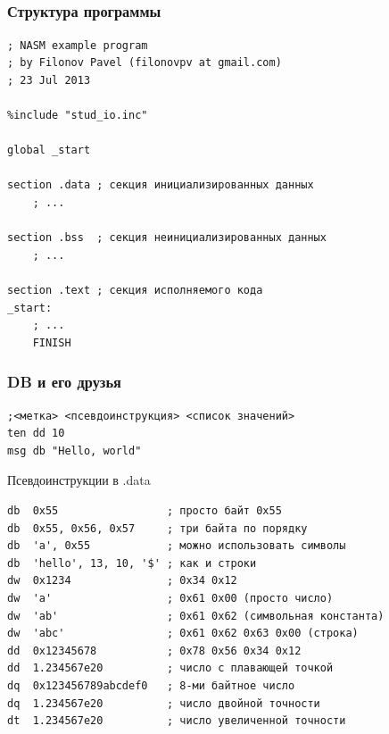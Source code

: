 \documentclass[utf8, russian]{beamer}
\begin{document}
    \subsection{}
    \begin{frame}[fragile]
        \frametitle{Структура программы}\small
        \begin{verbatim}
; NASM example program
; by Filonov Pavel (filonovpv at gmail.com)
; 23 Jul 2013

%include "stud_io.inc"

global _start

section .data ; секция инициализированных данных
    ; ...

section .bss  ; секция неинициализированных данных 
    ; ...

section .text ; секция исполняемого кода
_start:
    ; ...
    FINISH
        \end{verbatim}
\end{frame}
    \begin{frame}[fragile]
        \frametitle{DB и его друзья}\small
        \begin{verbatim}
;<метка> <псевдоинструкция> <список значений> 
ten dd 10 
msg db "Hello, world"\end{verbatim}
        \begin{block}{Псевдоинструкции в .data}\small
            \begin{verbatim}
db  0x55                 ; просто байт 0x55
db  0x55, 0x56, 0x57     ; три байта по порядку
db  'a', 0x55            ; можно использовать символы
db  'hello', 13, 10, '$' ; как и строки
dw  0x1234               ; 0x34 0x12
dw  'a'                  ; 0x61 0x00 (просто число)
dw  'ab'                 ; 0x61 0x62 (символьная константа)
dw  'abc'                ; 0x61 0x62 0x63 0x00 (строка)
dd  0x12345678           ; 0x78 0x56 0x34 0x12
dd  1.234567e20          ; число с плавающей точкой
dq  0x123456789abcdef0   ; 8-ми байтное число
dq  1.234567e20          ; число двойной точности
dt  1.234567e20          ; число увеличенной точности
            \end{verbatim}
        \end{block}
\end{frame}
\end{document}
